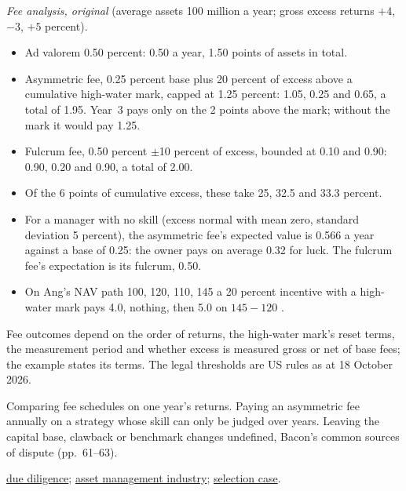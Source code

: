 \begin{qfmethod}
\emph{Fee analysis, original} (average assets 100 million a year; gross excess returns $+4$, $-3$, $+5$ percent).
\begin{itemize}
\item Ad valorem 0.50 percent: 0.50 a year, 1.50 points of assets in total.
\item Asymmetric fee, 0.25 percent base plus 20 percent of excess above a cumulative high-water mark, capped at 1.25 percent: 1.05, 0.25 and 0.65, a total of 1.95. Year~3 pays only on the 2 points above the mark; without the mark it would pay 1.25.
\item Fulcrum fee, 0.50 percent $\pm$10 percent of excess, bounded at 0.10 and 0.90: 0.90, 0.20 and 0.90, a total of 2.00.
\item Of the 6 points of cumulative excess, these take 25, 32.5 and 33.3 percent.
\item For a manager with no skill (excess normal with mean zero, standard deviation 5 percent), the asymmetric fee's expected value is 0.566 a year against a base of 0.25: the owner pays on average 0.32 for luck. The fulcrum fee's expectation is its fulcrum, 0.50.
\item On Ang's NAV path 100, 120, 110, 145 a 20 percent incentive with a high-water mark pays 4.0, nothing, then 5.0 on $145-120$ \citep[chap.~17, p.~582]{s7-ang}.
\end{itemize}

 Fee outcomes depend on the order of returns, the high-water mark's reset terms, the measurement period and whether excess is measured gross or net of base fees; the example states its terms. The legal thresholds are US rules as at 18 October 2026.

 Comparing fee schedules on one year's returns. Paying an asymmetric fee annually on a strategy whose skill can only be judged over years. Leaving the capital base, clawback or benchmark changes undefined, Bacon's common sources of dispute (pp.~61--63).

 \hyperref[meth:manager-due-diligence]{due diligence}; \hyperref[def:asset-management-industry]{asset management industry}; \hyperref[ex:manager-selection-case]{selection case}.

\end{qfmethod}


